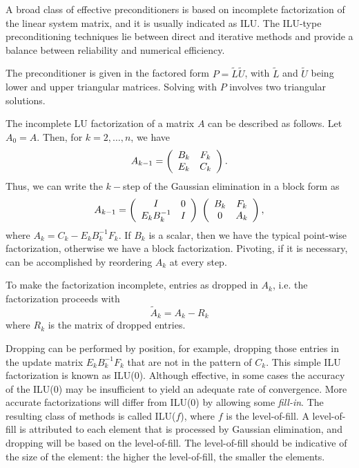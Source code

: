 \medskip

A broad class of effective preconditioners is based on incomplete
factorization of the linear system matrix, and it is usually indicated
as ILU.  The ILU-type preconditioning techniques lie between direct and
iterative methods and provide a balance between reliability and
numerical efficiency.

The preconditioner is given in the factored form
$P=\tilde{L} \tilde{U}$, with $\tilde{L}$ and $\tilde{U}$ being lower
and upper triangular matrices. Solving with $P$ involves two triangular
solutions.

The incomplete LU factorization of a matrix $A$ can be described as
follows. Let $A_0=A$. Then, for $k=2,\ldots,n$, we have
\[
A_{k-1} = 
\left(
\begin{array}{c c}
B_k & F_k \\
E_k & C_k \\
\end{array}
\right) .
\]
Thus, we can write the $k-$step of the Gaussian elimination in a block
form as
\[
A_{k-1} = 
\left(
\begin{array}{c c}
I & 0 \\
E_k B_k^{-1} & I \\
\end{array}
\right)
\;
\left(
\begin{array}{c c}
B_k & F_k \\
0 & A_k \\
\end{array}
\right) ,
\]
where $A_k = C_k - E_k B_k^{-1} F_k$. If $B_k$ is a scalar, then we have
the typical point-wise factorization, otherwise we have a block
factorization. Pivoting, if it is necessary, can be accomplished by
reordering $A_k$ at every step.

To make the factorization incomplete, entries as dropped in $A_k$, i.e.
the factorization proceeds with
\[
\tilde{A}_k = A_k - R_k
\]
where $R_k$ is the matrix of dropped entries. 

Dropping can be performed
by position, for example, dropping those entries in the update matrix
$E_k B_k^{-1} F_k$ that are not in the pattern of $C_k$. 
This simple ILU factorization is known as ILU(0). Although effective, in
some cases the accuracy of the ILU(0) may be insufficient to yield an
adequate rate of convergence. More accurate factorizations will differ
from ILU(0) by allowing some {\em fill-in}. The resulting class of
methods is called ILU($f$), where $f$ is the level-of-fill. A
level-of-fill is attributed to each element that is processed by
Gaussian elimination, and dropping will be based on the level-of-fill.
The level-of-fill should be indicative of the size of the element: the
higher the level-of-fill, the smaller the elements.  

